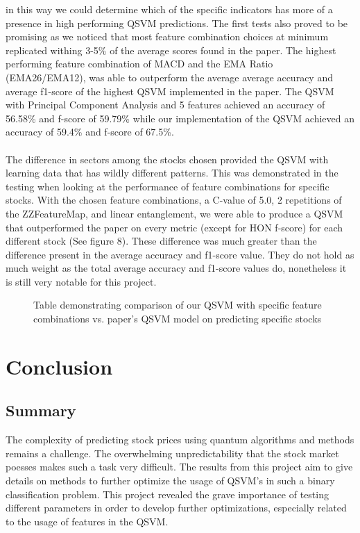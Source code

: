 \documentclass{article}
\begin{document}
in this way we could determine which of the specific indicators has more of a presence in high performing QSVM predictions. The first tests also proved to be promising as we noticed that most feature combination choices 
at minimum replicated withing 3-5\% of the average scores found in the paper. The highest performing feature combination of MACD and the EMA Ratio (EMA26/EMA12), was able to outperform the average 
average accuracy and average f1-score of the highest QSVM implemented in the paper. The QSVM with Principal Component Analysis and 5 features achieved an accuracy of 56.58\% and f-score of 
59.79\% while our implementation of the QSVM achieved an accuracy of 59.4\% and f-score of 67.5\%. 
\\
\\
The difference in sectors among the stocks chosen provided the QSVM with learning data that has wildly different patterns. This was demonstrated in the testing when looking at the 
performance of feature combinations for specific stocks. With the chosen feature combinations, a C-value of 5.0, 2 repetitions of the ZZFeatureMap, and linear entanglement, we were 
able to produce a QSVM that outperformed the paper on every metric (except for HON f-score) for each different stock (See figure 8). These difference was much greater than the difference present in the average accuracy and f1-score 
value. They do not hold as much weight as the total average accuracy and f1-score values do, nonetheless it is still very notable for this project. 
\begin{figure}[H]
    \centering
    \caption{Table demonstrating comparison of our QSVM with specific feature combinations vs. paper's QSVM model on predicting specific stocks}
    \label{fig:8}
\end{figure}
\noindent
\section*{Conclusion}
\subsection*{Summary}
The complexity of predicting stock prices using quantum algorithms and methods remains a challenge. The overwhelming unpredictability that 
the stock market poesses makes such a task very difficult. The results from this project aim to give details on methods to further optimize
the usage of QSVM's in such a binary classification problem. This project revealed the grave importance of testing different parameters in order to 
develop further optimizations, especially related to the usage of features in the QSVM. 
\end{document}
